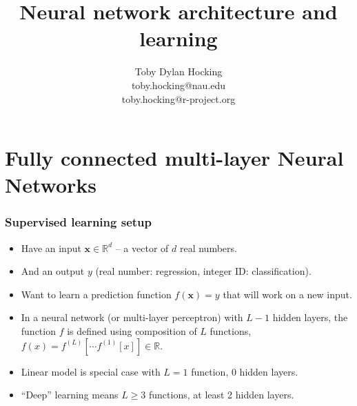 \documentclass{beamer}
\begin{document}
\title{Neural network architecture and learning}

\author{
  Toby Dylan Hocking\\
  toby.hocking@nau.edu\\
  toby.hocking@r-project.org\\
}

\maketitle


\section{Fully connected multi-layer Neural Networks}

\begin{frame}
  \frametitle{Supervised learning setup}
  \begin{itemize}
  \item Have an input $\mathbf x\in\mathbb R^d$ -- a vector of $d$
    real numbers.
  \item And an output $y$ (real number: regression, integer ID:
    classification).
  \item Want to learn a prediction function $f(\mathbf x) = y$ that
    will work on a new input.
  \item In a neural network (or multi-layer perceptron) with $L-1$
    hidden layers, the function $f$ is defined using composition of
    $L$ functions, $f(x)=f^{(L)}[\cdots f^{(1)}[x] ]\in\mathbb R$.
  \item Linear model is special case with $L=1$ function, 0 hidden
    layers.
  \item ``Deep'' learning means $L\geq 3$ functions, at least 2 hidden
    layers.
  \end{itemize}
\end{frame}
\end{document}
